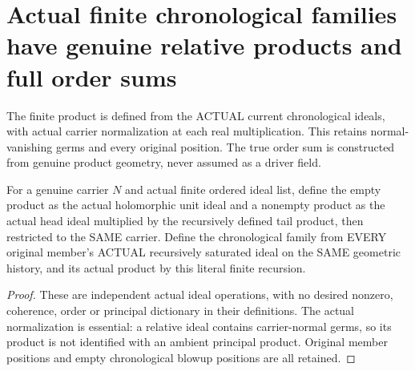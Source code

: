 \section{Actual finite chronological families have genuine relative products and full order sums}

The finite product is defined from the ACTUAL current chronological ideals,
with actual carrier normalization at each real multiplication. This retains
normal-vanishing germs and every original position. The true order sum is
constructed from genuine product geometry, never assumed as a driver field.

\begin{definition}
\label{hir:sharp-actual-finite-relative-ideal-product}
\leanok
For a genuine carrier $N$ and actual finite ordered ideal list, define the
empty product as the actual holomorphic unit ideal and a nonempty product
as the actual head ideal multiplied by the recursively defined tail product,
then restricted to the SAME carrier. Define the chronological family from
EVERY original member's ACTUAL recursively saturated ideal on the SAME
geometric history, and its actual product by this literal finite recursion.
\end{definition}
\begin{proof}
These are independent actual ideal operations, with no desired nonzero,
coherence, order or principal dictionary in their definitions. The actual
normalization is essential: a relative ideal contains carrier-normal germs,
so its product is not identified with an ambient principal product. Original
member positions and empty chronological blowup positions are all retained.
\end{proof}

